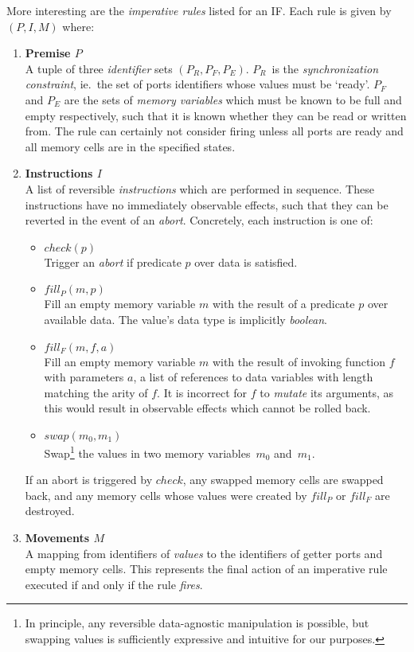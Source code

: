 More interesting are the \textit{imperative rules} listed for an IF. Each rule is given by $(P,I,M)$ where:
\begin{enumerate}
	\item \textbf{Premise $P$}\\
	A tuple of three \textit{identifier} sets $(P_R, P_F, P_E)$. $P_R$~is the \textit{synchronization constraint}, ie.\ the set of ports identifiers whose values must be `ready'. $P_F$ and $P_E$ are the sets of \textit{memory variables} which must be known to be full and empty respectively, such that it is known whether they can be read or written from. The rule can certainly not consider firing unless all ports are ready and all memory cells are in the specified states.
	
	\item \textbf{Instructions $I$}\\
	A list of reversible \textit{instructions} which are performed in sequence. These instructions have no immediately observable effects, such that they can be reverted in the event of an \textit{abort}. Concretely, each instruction is one of:
	\begin{itemize}
		\item $check(p)$\\
		Trigger an \textit{abort} if predicate $p$ over data is satisfied.
		\item $fill_P(m, p)$\\Fill an empty memory variable $m$ with the result of a predicate $p$ over available data. The value's data type is implicitly \textit{boolean}.
		\item $fill_F(m, f, a)$\\
		Fill an empty memory variable $m$ with the result of invoking function $f$ with parameters $a$, a list of references to data variables with length matching the arity of $f$. It is incorrect for $f$ to \textit{mutate} its arguments, as this would result in observable effects which cannot be rolled back.
		\item $swap(m_0,m_1)$\\
		Swap\footnote{In principle, any reversible data-agnostic manipulation is possible, but swapping values is sufficiently expressive and intuitive for our purposes.} the values in two memory variables~$m_0$ and~$m_1$.
	\end{itemize}
	If an abort is triggered by $check$, any swapped memory cells are swapped back, and any memory cells whose values were created by $fill_P$ or $fill_F$ are destroyed.
	
	\item \textbf{Movements $M$}\\
	A mapping from identifiers of \textit{values} to the identifiers of getter ports and empty memory cells. This represents the final action of an imperative rule executed if and only if the rule \textit{fires}.
\end{enumerate}

